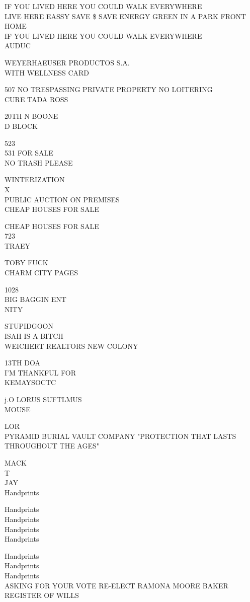 \documentclass[10pt,letterpaper]{article}
\begin{document}
IF YOU LIVED HERE YOU COULD WALK EVERYWHERE\\
LIVE HERE EASSY SAVE \$ SAVE ENERGY GREEN IN A PARK FRONT HOME\\
IF YOU LIVED HERE YOU COULD WALK EVERYWHERE\\
AUDUC

WEYERHAEUSER PRODUCTOS S.A.\\
WITH WELLNESS CARD

507 NO TRESPASSING PRIVATE PROPERTY NO LOITERING\\
CURE TADA ROSS

20TH N BOONE\\
D BLOCK

523\\
531 FOR SALE\\
NO TRASH PLEASE

WINTERIZATION\\
X\\
PUBLIC AUCTION ON PREMISES\\
CHEAP HOUSES FOR SALE

CHEAP HOUSES FOR SALE\\
723\\
TRAEY

TOBY FUCK\\
CHARM CITY PAGES

1028\\
BIG BAGGIN ENT\\
NITY

STUPIDGOON\\
ISAH IS A BITCH\\
WEICHERT REALTORS NEW COLONY

13TH DOA\\
I'M THANKFUL FOR\\
KEMAYSOCTC

j.O LORUS SUFTLMUS\\
MOUSE

LOR\\
PYRAMID BURIAL VAULT COMPANY "PROTECTION THAT LASTS THROUGHOUT THE AGES"

MACK\\
T\\
JAY\\
Handprints

Handprints\\
Handprints\\
Handprints\\
Handprints

Handprints\\
Handprints\\
Handprints\\
ASKING FOR YOUR VOTE RE{-}ELECT RAMONA MOORE BAKER REGISTER OF WILLS
\end{document}
